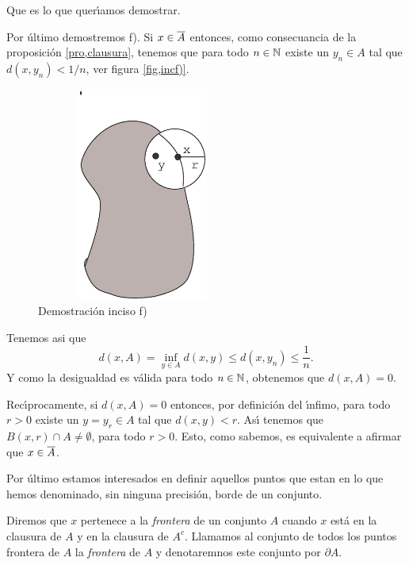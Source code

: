 \begin{demo}
Que es lo que quer\'{\i}amos demostrar.

Por \'ultimo demostremos f). Si $x\in \C{A}$ entonces, como
consecuancia de la proposici\'on \vref{pro,clausura}, tenemos que
para todo $n\in\nn$ existe un $y_n\in A$ tal que $d(x,y_n)<1/n$,
ver figura \vref{fig,incf)}.

\begin{figure}
\begin{center}
	\includegraphics[height=7cm, width=7cm]{puntocl.eps}
	\caption{Demostraci\'on inciso f)}\label{fig,incf)}
\end{center}
\end{figure}

Tenemos asi que
\[d(x,A)=\inf\limits_{y\in A}d(x,y)\leq d(x,y_n)\leq \frac1n.\]
Y como la desigualdad es v\'alida para todo $n\in\nn$, obtenemos
que $d(x,A)=0$.

Rec\'{\i}procamente, si $d(x,A)=0$ entonces, por definici\'on del
\'{\i}nfimo, para todo $r>0$ existe un $y=y_r\in A$ tal que
$d(x,y)<r$. As\'{\i} tenemos que $B(x,r)\cap A\neq \emptyset$,
para todo $r>0$. Esto, como sabemos, es equivalente a afirmar que
$x\in \C{A}$.
\end{demo}

Por \'ultimo estamos interesados en definir aquellos puntos que
estan en lo que hemos denominado, sin ninguna precisi\'on, borde
de un conjunto.

\begin{definicion} Diremos que $x$ pertenece a la \emph{frontera} de un
conjunto $A$ cuando $x$ est\'a en la clausura de $A$ y en la
clausura de $A^c$. Llamamos al conjunto de todos los puntos
frontera de $A$ la \emph{frontera }de $A$ y denotaremnos este
conjunto por $\partial A$. \end{definicion}


